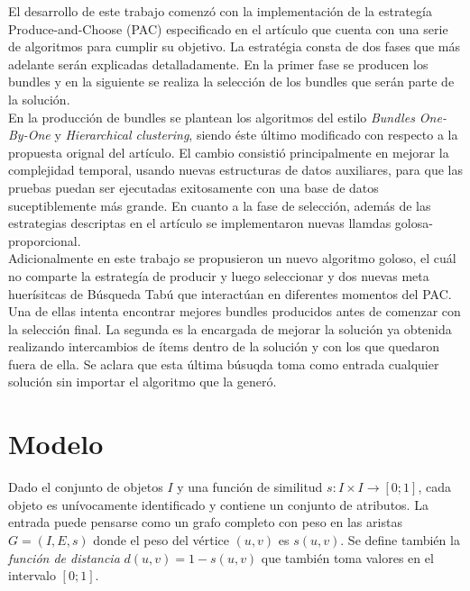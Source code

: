 El desarrollo de este trabajo comenzó con la implementación de la estrategía Produce-and-Choose (PAC) especificado en el artículo \cite{compositeRetrival} que cuenta con una serie de algoritmos para cumplir su objetivo. La estratégia consta de dos fases que más adelante serán explicadas detalladamente. En la primer fase se producen los bundles y en la siguiente se realiza la selección de los bundles que serán parte de la solución.\\
En la producción de bundles se plantean los algoritmos del estilo \textit{Bundles One-By-One} y \textit{Hierarchical clustering}, siendo éste último modificado con respecto a la propuesta orignal del artículo. El cambio consistió principalmente en mejorar la complejidad temporal, usando nuevas estructuras de datos auxiliares, para que las pruebas puedan ser ejecutadas exitosamente con una base de datos suceptiblemente más grande. En cuanto a la fase de selección, además de las estrategias descriptas en el artículo se implementaron nuevas llamdas golosa-proporcional.\\
Adicionalmente en este trabajo se propusieron un nuevo algoritmo goloso, el cuál no comparte la estrategía de producir y luego seleccionar y dos nuevas meta huerísitcas de Búsqueda Tabú que interactúan en diferentes momentos del PAC. Una de ellas intenta encontrar mejores bundles producidos antes de comenzar con la selección final. La segunda es la encargada de mejorar la solución ya obtenida realizando intercambios de ítems dentro de la solución y con los que quedaron fuera de ella. Se aclara que esta última búsuqda toma como entrada cualquier solución sin importar el algoritmo que la generó.
\section{Modelo}
Dado el conjunto de objetos $I$ y una función de similitud $ s: I \times I \rightarrow [0;1]$, cada objeto es unívocamente identificado y contiene un conjunto de atributos. La entrada puede pensarse como un grafo completo con peso en las aristas $G=(I,E,s)$ donde el peso del vértice $(u,v)$ es $s(u,v)$. Se define también la \textit{función de distancia} $d(u,v) = 1 - s(u,v)$ que también toma valores en el intervalo $[0;1]$.

